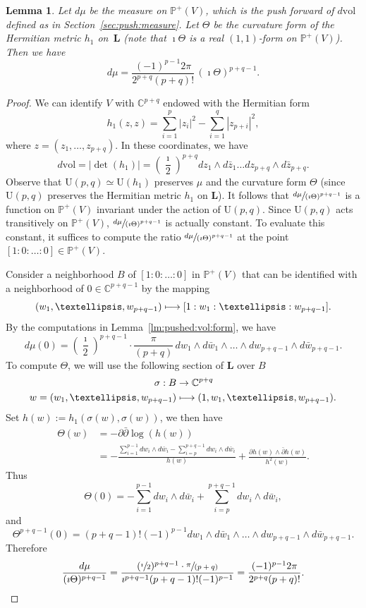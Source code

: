 \documentclass[11pt]{article}
\numberwithin{equation}{section}
\newcommand\mto{\mathchoice{\longmapsto}{\mapsto}{\mapsto}{\mapsto}}
\theoremstyle{plain}
\newtheorem{Lemma}[Theorem]{Lemma}
\theoremstyle{definition}
\def\C{\mathbb{C}}
\newcommand{\Pb}{\mathbb{P}}
\newcommand{\Lb}{\mathbf{L}}
\newcommand{\vol}{\mathrm{vol}}
\newcommand{\Ur}{\mathrm{U}}
\begin{document}
\begin{Lemma}\label{lm:vol:form:chern:curv}
Let $d\mu$ be the measure on $\Pb^+(V)$, which is the push forward of $d\vol$ defined as in Section~\ref{sec:push:measure}.
Let $\Theta$ be the curvature form of the Hermitian metric $h_1$ on~$\Lb$ (note that $\imath\Theta$ is a real $(1,1)$-form on $\Pb^+(V)$).
Then we have
\[
d\mu=\frac{(-1)^{p-1}2\pi}{2^{p+q}(p+q)!}\,(\imath\Theta)^{p+q-1}.
\]
\end{Lemma}
\begin{proof}
We can identify $V$ with $\C^{p+q}$ endowed with the Hermitian form
\[
h_1(z,z)=\sum_{i=1}^p |z_i|^2-\sum_{i=1}^q |z_{p+i}|^2,
\]
where $z=(z_1,\dots,z_{p+q})$. In these coordinates, we have
\[
d\vol=|{\det}(h_1)|=\left(\frac{\imath}{2}\right)^{p+q}dz_1\wedge d\bar{z}_1\dots dz_{p+q}\wedge d\bar{z}_{p+q}.
\]
Observe that $\Ur(p,q)\simeq \Ur(h_1)$ preserves $\mu$ and the curvature form $\Theta$ (since $\Ur(p,q)$ preserves the Hermitian metric $h_1$ on $\Lb$).
It follows that $\sfrac{d\mu}{(\imath\Theta)^{p+q-1}}$ is a function on $\Pb^+(V)$ invariant under the action of $\Ur(p,q)$.
Since $\Ur(p,q)$ acts transitively on $\Pb^+(V)$, $\sfrac{d\mu}{(\imath\Theta)^{p+q-1}}$ is actually constant.
To evaluate this constant, it suffices to compute the ratio $\sfrac{d\mu}{(\imath\Theta)^{p+q-1}}$ at the point $[1:0:\dots:0] \in \Pb^+(V)$.

Consider a neighborhood $B$ of $[1:0:\dots:0]$ in $\Pb^+(V)$ that can be identified with a neighborhood of $0\in \C^{p+q-1}$ by the mapping
\[
(w_1,\dots,w_{p+q-1}) \mto [1:w_1:\dots:w_{p+q-1}].
\]
By the computations in Lemma~\ref{lm:pushed:vol:form}, we have
\[
d\mu(0)=\left(\frac{\imath}{2}\right)^{p+q-1}\cdot\frac{\pi}{(p+q)}\,dw_1\wedge d\bar{w}_1\wedge\dots\wedge dw_{p+q-1}\wedge d\bar{w}_{p+q-1}.
\]
To compute $\Theta$, we will use the following section of $\Lb$ over $B$
\begin{align*}
\sigma: B & \to  \C^{p+q} \\
 w=(w_1,\dots,w_{p+q-1}) & \mto  (1,w_1,\dots,w_{p+q-1}).
\end{align*}
Set $h(w):=h_1(\sigma(w),\sigma(w))$, we then have
\begin{align*}
\Theta(w) &=  -\partial\bar{\partial}\log(h(w)) \\
& = -\frac{\sum_{i=1}^{p-1}dw_i\wedge d\bar{w}_i-\sum_{i=p}^{p+q-1}dw_i\wedge d\bar{w}_i}{h(w)} + \frac{\partial h(w)\wedge\bar{\partial}h(w)}{h^2(w)}.
\end{align*}
Thus
\[
\Theta(0)=-\sum_{i=1}^{p-1}dw_i\wedge d\bar{w}_i+\sum_{i=p}^{p+q-1}dw_i \wedge d\bar{w}_i,
\]
and
\[
\Theta^{p+q-1}(0)=(p+q-1)!(-1)^{p-1}dw_1\wedge d\bar{w}_1\wedge\dots\wedge dw_{p+q-1}\wedge d\bar{w}_{p+q-1}.
\]
Therefore
\[
\frac{d\mu}{(\imath\Theta)^{p+q-1}}= \frac{(\sfrac{\imath}{2})^{p+q-1}\cdot\sfrac{\pi}{(p+q)}}{\imath^{p+q-1} (p+q-1)!(-1)^{p-1}} = \frac{(-1)^{p-1}2\pi}{2^{p+q}(p+q)!}.\qedhere
\]
\end{proof}
\end{document}

